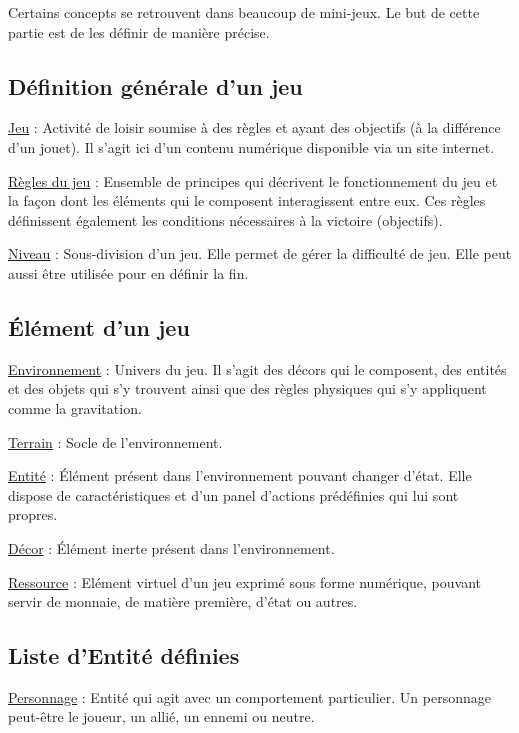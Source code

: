 Certains concepts se retrouvent dans beaucoup de mini-jeux. Le but de cette partie est de les définir de manière précise.

\subsection*{Définition générale d'un jeu}

\underline{Jeu} : 
Activité de loisir soumise à des règles et ayant des objectifs (à la différence d'un jouet). Il s'agit ici d'un contenu numérique
 disponible via un site internet.

\underline{Règles du jeu} : 
Ensemble de principes qui décrivent le fonctionnement du jeu et 
la façon dont les éléments qui le composent interagissent entre eux. 
Ces règles définissent également les conditions nécessaires à la victoire (objectifs).

\underline{Niveau} :
Sous-division d'un jeu. Elle permet de gérer la difficulté de jeu. Elle peut aussi être utilisée pour en définir la fin. 

\subsection*{Élément d'un jeu}

\underline{Environnement} : 
Univers du jeu. Il s'agit des décors qui le composent, des entités et des objets qui s'y trouvent ainsi que 
des règles physiques qui s'y appliquent comme la gravitation.

\underline{Terrain} : 
Socle de l'environnement.

\underline{Entité} : 
Élément présent dans l'environnement pouvant changer d'état. 
Elle dispose de caractéristiques et d'un panel d'actions prédéfinies qui lui sont propres.

\underline{Décor} : 
Élément inerte présent dans l'environnement.

\underline{Ressource} : 
Elément virtuel d'un jeu exprimé sous forme numérique, pouvant servir de monnaie, de matière première, d'état ou autres.

\subsection*{Liste d'Entité définies}

\underline{Personnage} :
Entité qui agit avec un comportement particulier. Un personnage peut-être le joueur, un allié, un ennemi ou neutre.

